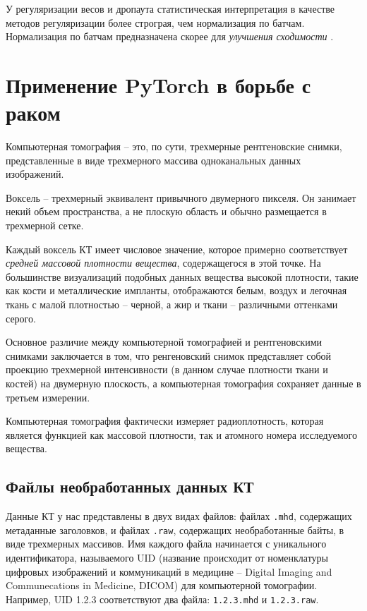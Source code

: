 \documentclass[%
	11pt,
	a4paper,
	utf8,
		]{article}
\begin{document}
У регуляризации весов и дропаута статистическая интерпретация в качестве методов регуляризации более строграя, чем нормализация по батчам. Нормализация по батчам предназначена скорее для \emph{улучшения сходимости} \cite[]{pytorch-2022}.

\section{Применение PyTorch в борьбе с раком}

Компьютерная томография -- это, по сути, трехмерные рентгеновские снимки, представленные в виде трехмерного массива одноканальных данных изображений.

Воксель -- трехмерный эквивалент привычного двумерного пикселя. Он занимает некий объем пространства, а не плоскую область и обычно размещается в трехмерной сетке.

Каждый воксель КТ имеет числовое значение, которое примерно соответствует \emph{средней массовой плотности вещества}, содержащегося в этой точке. На большинстве визуализаций подобных данных вещества высокой плотности, такие как кости и металлические импланты, отображаются белым, воздух и легочная ткань с малой плотностью -- черной, а жир и ткани -- различными оттенками серого.

Основное различие между компьютерной томографией и рентгеновскими снимками заключается в том, что ренгеновский снимок представляет собой проекцию трехмерной интенсивности (в данном случае плотности ткани и костей) на двумерную плоскость, а компьютерная томография сохраняет данные в третьем измерении.

Компьютерная томография фактически измеряет радиоплотность, которая является функцией как массовой плотности, так и атомного номера исследуемого вещества.

\subsection{Файлы необработанных данных КТ}

Данные КТ у нас представлены в двух видах файлов: файлах \verb|.mhd|, содержащих метаданные заголовков, и файлах \verb|.raw|, содержащих необработанные байты, в виде трехмерных массивов. Имя каждого файла начинается с уникального идентификатора, называемого UID (название происходит от номенклатуры цифровых изображений и коммуникаций в медицине -- Digital Imaging and Communecations in Medicine, DICOM) для компьютерной томографии. Например, UID 1.2.3 соответствуют два файла: \verb|1.2.3.mhd| и \verb|1.2.3.raw|.
\end{document}
